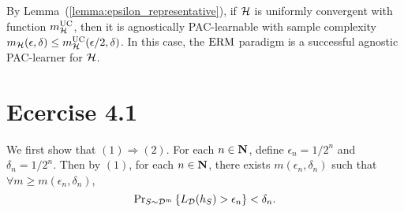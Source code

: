 By Lemma~(\ref{lemma:epsilon_representative}), if $\mathcal{H}$ is uniformly convergent
with function $m_{\mathcal{H}}^{\text{UC}}$, then it is agnostically PAC-learnable with sample 
complexity $m_{\mathcal{H}}(\epsilon, \delta) \leq m_{\mathcal{H}}^{\text{UC}}(\epsilon / 2, \delta)$. In 
this case, the $\operatorname{ERM}$ paradigm is a successful agnostic PAC-learner for $\mathcal{H}$.

\section*{Ecercise 4.1}

We first show that $(1) \Rightarrow (2)$. For each $n \in \mathbf{N}$, define 
$\epsilon_n = 1 / 2^n$ and $\delta_n = 1 / 2^n$. Then by $(1)$, for each 
$n \in \mathbf{N}$, there exists $m(\epsilon_n, \delta_n)$ such that 
$\forall m \geq m(\epsilon_n, \delta_n)$, 
\[
    \text{Pr}_{S \sim \mathcal{D}^{m}} \left \{ L_{\mathcal{D}} (h_S) > \epsilon_n \right \} < \delta_n.
\]
